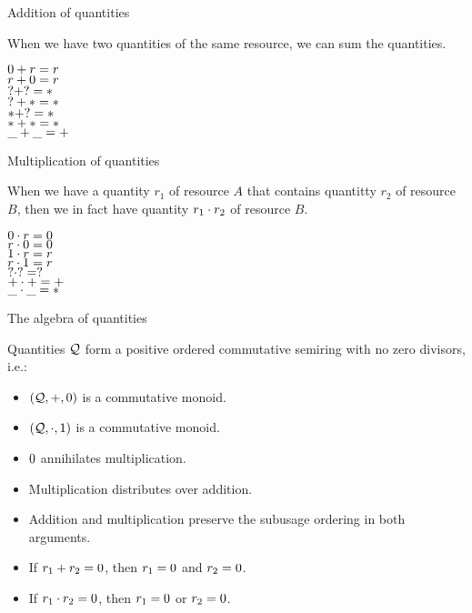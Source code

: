 \begin{frame}{Addition of quantities}

When we have two quantities of the same resource, we can sum the quantities.

\vspace{2em}

\begin{center}
  $0 + r = r$ \\
  $r + 0 = r$ \\
  $? + ? = *$ \\
  $? + * = *$ \\
  $* + ? = *$ \\
  $* + * = *$ \\
  $\_ + \_ = +$
\end{center}

\end{frame}

\begin{frame}{Multiplication of quantities}

When we have a quantity $r_1$ of resource $A$ that contains quantitty $r_2$ of resource $B$, then we in fact have quantity $r_1 \cdot r_2$ of resource $B$.

\vspace{2em}

\begin{center}
  $0 \cdot r = 0$ \\
  $r \cdot 0 = 0$ \\
  $1 \cdot r = r$ \\
  $r \cdot 1 = r$ \\
  $? \cdot ? = ?$ \\
  $+ \cdot + = +$ \\
  $\_ \cdot \_ = *$
\end{center}

\end{frame}

\begin{frame}{The algebra of quantities}

Quantities $\mathcal{Q}$ form a positive ordered commutative semiring with no zero divisors, i.e.:

\begin{itemize}
  \item $(\mathcal{Q}, +, 0)$ is a commutative monoid.
  \item $(\mathcal{Q}, \cdot, 1)$ is a commutative monoid.
  \item $0$ annihilates multiplication.
  \item Multiplication distributes over addition.
  \item Addition and multiplication preserve the subusage ordering in both arguments.
  \item If $r_1 + r_2 = 0$, then $r_1 = 0$ and $r_2 = 0$.
  \item If $r_1 \cdot r_2 = 0$, then $r_1 = 0$ or $r_2 = 0$.
\end{itemize}

\end{frame}